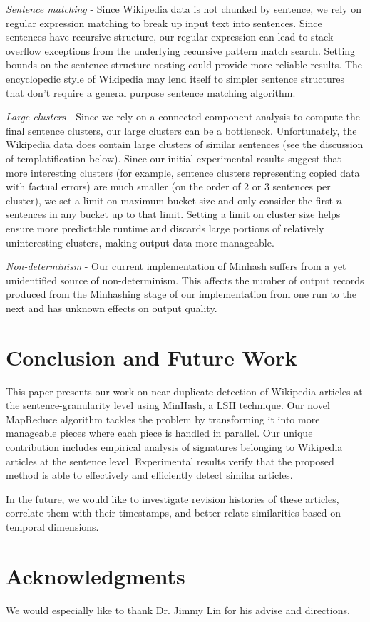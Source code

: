 \documentclass{acm_proc_article-sp}
\begin{document}
\emph{Sentence matching} - Since Wikipedia data is not chunked by sentence, we rely on regular expression matching to break up input text into sentences. Since sentences have recursive structure, our regular expression can lead to stack overflow exceptions from the underlying recursive pattern match search. Setting bounds on the sentence structure nesting could provide more reliable results. The encyclopedic style of Wikipedia may lend itself to simpler sentence structures that don't require a general purpose sentence matching algorithm.

\emph{Large clusters} - Since we rely on a connected component analysis to compute the final sentence clusters, our large clusters can be a bottleneck. Unfortunately, the Wikipedia data does contain large clusters of similar sentences (see the discussion of templatification below). Since our initial experimental results suggest that more interesting clusters (for example, sentence clusters representing copied data with factual errors) are much smaller (on the order of 2 or 3 sentences per cluster), we set a limit on maximum bucket size and only consider the first $n$ sentences in any bucket up to that limit. Setting a limit on cluster size helps ensure more predictable runtime and discards large portions of relatively uninteresting clusters, making output data more manageable.

\emph{Non-determinism} - Our current implementation of Minhash suffers from a yet unidentified source of non-determinism. This affects the number of output records produced from the Minhashing stage of our implementation from one run to the next and has unknown effects on output quality. 

\section{Conclusion and Future Work}
This paper presents our work on near-duplicate detection of Wikipedia articles at the sentence-granularity level using MinHash, a LSH technique. Our novel MapReduce algorithm tackles the problem by transforming it into more manageable pieces where each piece is handled in parallel. Our unique contribution includes empirical analysis of signatures belonging to Wikipedia articles at the sentence level. Experimental results verify that the proposed method is able to effectively and efficiently detect similar articles.

In the future, we would like to investigate revision histories of these articles, correlate them with their timestamps, and better relate similarities based on temporal dimensions. 

\section{Acknowledgments}
We would especially like to thank Dr. Jimmy Lin for his advise and directions.



\balancecolumns
\end{document}
